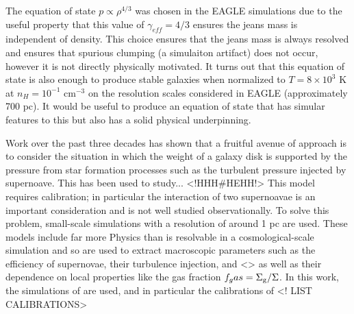 The equation of state $p \propto \rho^{4/3}$ was chosen in the EAGLE simulations \citep{schaye2015} due to the useful property that this value of $\gamma_{eff} = 4/3$ ensures the jeans mass is independent of density.
This choice ensures that the jeans mass is always resolved and ensures that spurious clumping (a simulaiton artifact) does not occur, however it is not directly physically motivated.
It turns out that this equation of state is also enough to produce stable galaxies when normalized to $T = 8\times 10^3$ K at $n_H = 10^{-1}$ cm$^{-3}$ on the resolution scales considered in EAGLE (approximately 700 pc).
It would be useful to produce an equation of state that has simular features to this but also has a solid physical underpinning.

Work over the past three decades has shown that a fruitful avenue of approach is to consider the situation in which the weight of a galaxy disk is supported by the pressure from star formation processes such as the turbulent pressure injected by supernoave. 
This has been used to study... <!HHH#HEHH!>
This model requires calibration; in particular the interaction of two supernoavae is an important consideration and is not well studied observationally.
To solve this problem, small-scale simulations with a resolution of around 1 pc \citep{martizzi2015} are used.
These models include far more Physics than is resolvable in a cosmological-scale simulation and so are used to extract macroscopic parameters such as the efficiency of supernovae, their turbulence injection, and <> as well as their dependence on local properties like the gas fraction $f_gas = \Sigma_\mathrm{g}/\Sigma$.
In this work, the simulations of \citet{martizzi2015} are used, and in particular the calibrations of
<! LIST CALIBRATIONS>
